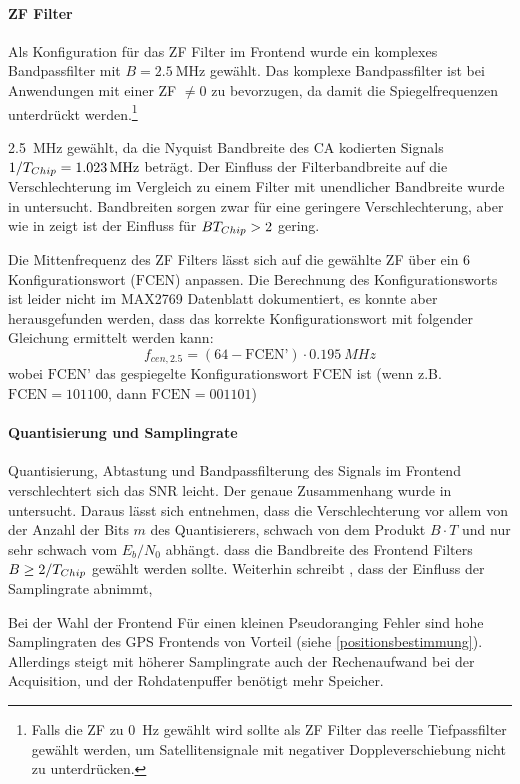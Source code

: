 \paragraph{ZF Filter}
Als Konfiguration für das ZF Filter im Frontend wurde ein komplexes Bandpassfilter mit $B=\SI{2.5}{\MHz}$ gewählt. Das komplexe Bandpassfilter ist bei Anwendungen mit einer ZF $\neq 0$ zu bevorzugen, da damit die Spiegelfrequenzen unterdrückt werden.\footnote{Falls die ZF zu \SI{0}{\Hz} gewählt wird sollte als ZF Filter das reelle Tiefpassfilter gewählt werden, um Satellitensignale mit negativer Doppleverschiebung nicht zu unterdrücken.}

\SI{2.5}{MHz} gewählt, da die Nyquist Bandbreite des \gls{CA} kodierten Signals $1/\gpsTchip=\SI{1.023}{\MHz}$ beträgt. Der Einfluss der Filterbandbreite auf die Verschlechterung im Vergleich zu einem Filter mit unendlicher Bandbreite wurde in \cite{itc1982chang} untersucht. Bandbreiten sorgen zwar für eine geringere Verschlechterung, aber wie in  zeigt ist der Einfluss für $B {T}_{Chip}>2$ gering.

Die Mittenfrequenz des ZF Filters lässt sich auf die gewählte ZF über ein \SI{6}{\bit} Konfigurationswort ($\textrm{FCEN}$) anpassen. Die Berechnung des Konfigurationsworts ist leider nicht im MAX2769 Datenblatt dokumentiert, es konnte aber herausgefunden werden, dass das korrekte Konfigurationswort mit folgender Gleichung ermittelt werden kann: 
\begin{equation}
    f_{cen,2.5} = (64 - \textrm{FCEN'}) \cdot \SI{0.195}{MHz}
\end{equation}
wobei $\textrm{FCEN'}$ das gespiegelte Konfigurationswort $\textrm{FCEN}$ ist (wenn z.B. $\textrm{FCEN}=101100$, dann $\textrm{FCEN}=001101$)

\paragraph{Quantisierung und Samplingrate}
Quantisierung, Abtastung und Bandpassfilterung des Signals im Frontend verschlechtert sich das SNR leicht. Der genaue Zusammenhang wurde in \cite{itc1982chang} untersucht. Daraus lässt sich entnehmen, dass die Verschlechterung vor allem von der Anzahl der Bits $m$ des Quantisierers, schwach von dem Produkt $B\cdot T$ und nur sehr schwach vom $E_b/N_0$ abhängt. dass die Bandbreite des Frontend Filters $B\geq 2/{T}_{Chip}$ gewählt werden sollte. Weiterhin schreibt \cite{itc1982chang}, dass der Einfluss der Samplingrate abnimmt, 

Bei der Wahl der Frontend Für einen kleinen Pseudoranging Fehler sind hohe Samplingraten des GPS Frontends von Vorteil (siehe \ref{positionsbestimmung}). Allerdings steigt mit höherer Samplingrate auch der Rechenaufwand bei der Acquisition, und der Rohdatenpuffer benötigt mehr Speicher. 

